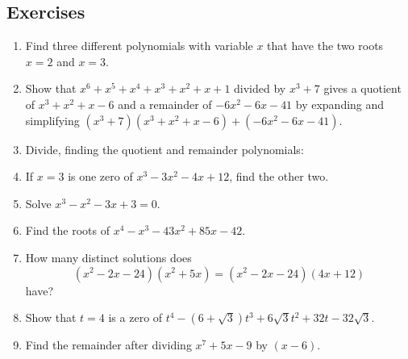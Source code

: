 \documentclass[a4paper,10pt,titlepage]{article}
\theoremstyle{definition}
\begin{document}
\subsection*{Exercises}
\begin{enumerate}
  \item Find three different polynomials with variable $ x $ that have the two roots $ x = 2 $ and $ x = 3 $.
  \item Show that $ x^6 + x^5 + x^4 + x^3 + x^2 + x + 1 $ divided by $ x^3 + 7 $ gives
        a quotient of $ x^3 + x^2 + x - 6 $ and a remainder of $ -6x^2 - 6x - 41 $ by
        expanding and simplifying $ (x^3 + 7)(x^3 + x^2 + x - 6) + (-6x^2 - 6x - 41) $.
  \item Divide, finding the quotient and remainder polynomials:
  \item If $ x = 3 $ is one zero of $ x^3 - 3x^2 - 4x + 12 $, find the other two.
  \item Solve $ x^3 - x^2 - 3x + 3 = 0 $.
  \item Find the roots of $ x^4 - x^3 - 43x^2 + 85x - 42 $.
  \item How many distinct solutions does
        \begin{displaymath}
          (x^2 - 2x - 24)(x^2 + 5x) = (x^2 - 2x - 24)(4x + 12)
        \end{displaymath}
        have?
  \item Show that $ t = 4 $ is a zero of $ t^4 - (6 + \sqrt{3})t^3 + 6\sqrt{3}t^2 + 32t -32\sqrt{3} $.
  \item Find the remainder after dividing $ x^7 + 5x - 9 $ by $ (x-6) $.
        \begin{center}\end{center}

\end{enumerate}
\end{document}
